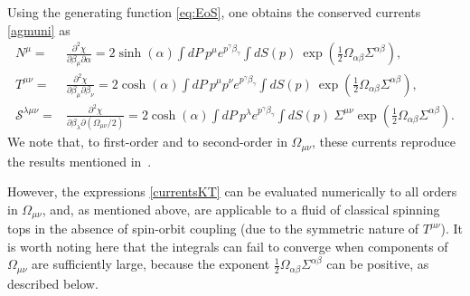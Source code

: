 \documentclass[12pt,aps,prd,nofootinbib,noshowkeys,noshowpacs,longbibliography,
superscriptaddress,tightenlines,floatfix,preprintnumbers]{revtex4-2}
\newcommand{\p}{\partial}
\begin{document}
Using the generating function \eqref{eq:EoS}, one obtains the conserved currents \eqref{agmuni} as
\begin{equation} \label{currentsKT}
    \begin{split}
    	N^\mu =& \frac{\p^2 \chi}{\p \beta_\mu \p \alpha} = 2 \sinh(\alpha) \int dP\ p^\mu e^{p^\gamma \beta_\gamma} \int dS(p)\ \exp\left( \frac{1}{2}\Omega_{\alpha\beta}\Sigma^{\alpha\beta} \right), \\
    	T^{\mu\nu} =& \frac{\p^2\chi}{\p\beta_\mu\p \beta_\nu} = 2\cosh(\alpha) \int dP\ p^\mu p^\nu e^{p^\gamma \beta_\gamma} \int dS(p)\ \exp\left( \frac{1}{2}\Omega_{\alpha\beta} \Sigma^{\alpha\beta}\right), \\
        \mathcal{S}^{\lambda\mu\nu} =& \frac{\p^2 \chi}{\p \beta_\lambda \p(\Omega_{\mu\nu}/2)} = 2 \cosh(\alpha) \int dP\ p^\lambda e^{p^\gamma \beta_\gamma}\int dS(p)\ \Sigma^{\mu\nu} \exp\left( \frac{1}{2}\Omega_{\alpha\beta} \Sigma^{\alpha\beta}\right).
    \end{split}
\end{equation}
We note that, to first-order and to second-order in $\Omega_{\mu\nu}$, these currents reproduce the results mentioned in~\cite{Florkowski:2019qdp,Singh:2020rht,Florkowski:2021wvk,Weickgenannt:2022zxs,Florkowski:2024bfw}. 

However, the expressions \eqref{currentsKT} can be evaluated numerically to all orders in $\Omega_{\mu\nu}$, and, as mentioned above, are applicable to a fluid of classical spinning tops in the absence of spin-orbit coupling (due to the symmetric nature of $T^{\mu\nu}$). It is worth noting here that the integrals can fail to converge when components of $\Omega_{\mu\nu}$ are sufficiently large, because the exponent $\frac{1}{2}\Omega_{\alpha\beta}\Sigma^{\alpha\beta}$ can be positive, as described below.
\end{document}
